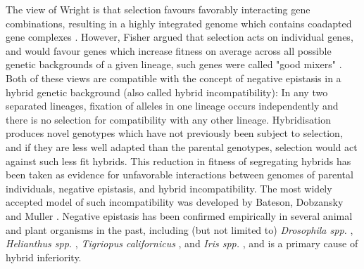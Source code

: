 The view of Wright is that selection favours favorably interacting gene combinations, resulting in a highly integrated genome which contains coadapted gene complexes \parencite{Wright1931,Wright1932TheEvolution,dobzhansky1970genetics}. However, Fisher argued that selection acts on individual genes, and would favour genes which increase fitness on average across all possible genetic backgrounds of a given lineage, such genes were called "good mixers" \parencite{Fisher1930THESELECTION}. Both of these views are compatible with the concept of negative epistasis \parencite{Hedrick2013,Burke2001GeneticsHybrids} in a hybrid genetic background (also called hybrid incompatibility): In any two separated lineages, fixation of alleles in one lineage occurs independently and there is no selection for compatibility with any other lineage. Hybridisation produces novel genotypes which have not previously been subject to selection, and if they are less well adapted than the parental genotypes, selection would act against such less fit hybrids. This reduction in fitness of segregating hybrids has been taken as evidence for unfavorable interactions between genomes of parental individuals, negative epistasis, and hybrid incompatibility. The most widely accepted model of such incompatibility was developed by Bateson, Dobzansky and Muller \parencite{Dobzhansky1936StudiesHybrids.,Muller1942IsolatingTemperature}. Negative epistasis has been confirmed empirically in several animal and plant organisms in the past, including (but not limited to) \textit{Drosophila spp.} \parencite{True1996,Palopoli1994GeneticsStudies,Hollocher1996TheEffects,Cabot1994GeneticsSterility}, \textit{Helianthus spp.} \parencite{Rieseberg1996,Rieseberg1999HybridSpecies}, \textit{Tigriopus californicus} \parencite{Burton1990HybridApproach,Burton1990,Burton1999GeneticComplexes}, and \textit{Iris spp.} \parencite{Cruzan1994AssortativeZone,Burke1998GeneticHybrids}, and is a primary cause of hybrid inferiority.

